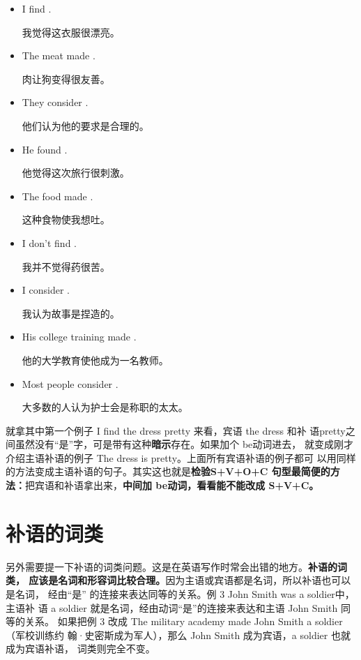 \begin{itemize}
\item  I find  .

  我觉得这衣服很漂亮。
\item  The meat made  .

  肉让狗变得很友善。
\item  They consider  .

  他们认为他的要求是合理的。
\item  He found  .

  他觉得这次旅行很刺激。
\item  The food made  .

  这种食物使我想吐。
\item  I don't find  .

  我并不觉得药很苦。
\item  I consider  .

  我认为故事是捏造的。
\item  His college training made  .

  他的大学教育使他成为一名教师。
\item  Most people consider  .

  大多数的人认为护士会是称职的太太。
\end{itemize}

就拿其中第一个例子 I find the dress pretty 来看，宾语 the dress 和补
语pretty之间虽然没有“是”字，可是带有这种\textbf{暗示}存在。如果加个 be动词进去，
就变成刚才介绍主语补语的例子 The dress is pretty。上面所有宾语补语的例子都可
以用同样的方法变成主语补语的句子。其实这也就是\textbf{检验S+V+O+C 句型最简便的方
  法：}把宾语和补语拿出来，\textbf{中间加 be动词，看看能不能改成 S+V+C。}

\section{补语的词类}

另外需要提一下补语的词类问题。这是在英语写作时常会出错的地方。\textbf{补语的词类，
  应该是名词和形容词比较合理。}因为主语或宾语都是名词，所以补语也可以是名词，
经由“是” 的连接来表达同等的关系。例 3 John Smith was a soldier中，主语补
语 a soldier 就是名词，经由动词“是”的连接来表达和主语 John Smith 同等的关系。
如果把例 3 改成 The military academy made John Smith a soldier（军校训练约
翰·史密斯成为军人），那么 John Smith 成为宾语，a soldier 也就成为宾语补语，
词类则完全不变。


